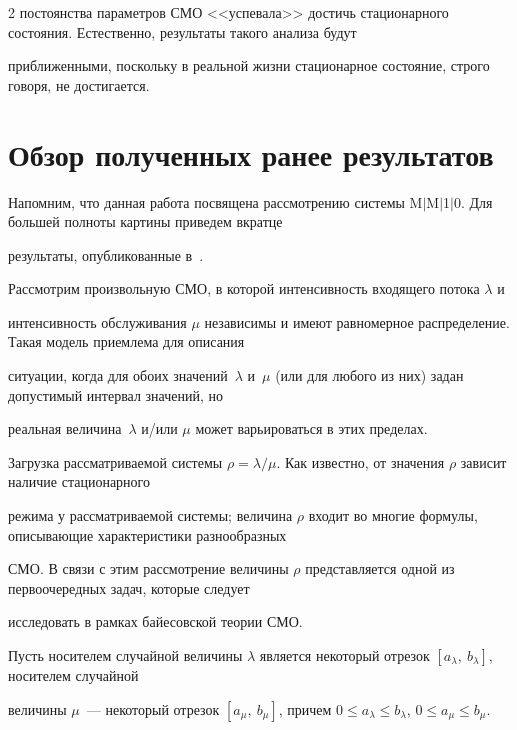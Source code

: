 \begin{multicols}{2}
постоянства параметров СМО <<успевала>> достичь стационарного состояния. Естественно, результаты такого анализа будут


приближенными, поскольку в реальной жизни стационарное состояние, строго говоря, не достигается.





\section{Обзор полученных ранее результатов}





Напомним, что данная работа посвящена рассмотрению системы M$\vert$M$\vert$1$\vert$0. Для большей полноты картины приведем вкратце


результаты, опубликованные в~\cite{Apice06}.





Рассмотрим произвольную СМО, в которой интенсивность входящего потока $\lambda$ и


интенсивность обслуживания $\mu$ независимы и имеют равномерное распределение. Такая модель приемлема для описания


ситуации, когда для обоих значений~$\lambda$ и~$\mu$ (или для любого из них) задан допустимый интервал значений, но


реальная величина~$\lambda$ и/или $\mu$ может варьироваться в этих пределах.





Загрузка рассматриваемой системы $\rho=\lambda/\mu$. Как известно, от значения $\rho$ зависит наличие стационарного


режима у рассматриваемой системы; величина $\rho$ входит во многие формулы, опи\-сы\-ва\-ющие характеристики разнообразных


СМО. В связи с этим рассмотрение величины $\rho$ представляется одной из первоочередных задач, которые следует


исследовать в рамках байесовской теории СМО.





Пусть носителем случайной величины $\lambda$ является некоторый отрезок $[a_\lambda,\ b_\lambda]$, носителем случайной


величины $\mu$~--- некоторый отрезок $[a_\mu,\ b_\mu]$, причем $0\le a_\lambda\le b_\lambda$, $0\le a_\mu\le b_\mu$.






\end{multicols}
